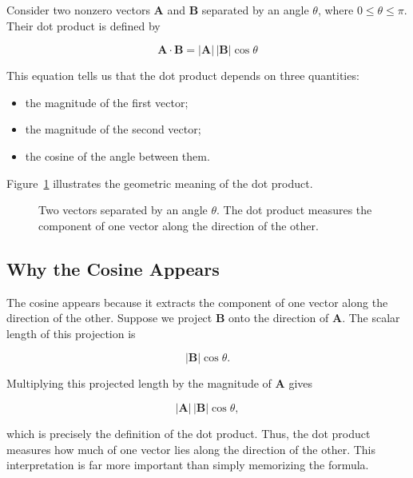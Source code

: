 Consider two nonzero vectors $\mathbf A$ and $\mathbf B$ separated by an angle
$\theta$, where $0\leq\theta\leq\pi$. Their dot product is defined by

\[
\boxed{
\mathbf A\cdot\mathbf B
=
\lvert\mathbf A\rvert\,\lvert\mathbf B\rvert\cos\theta
}
\]

This equation tells us that the dot product depends on three quantities:

\begin{itemize}
  \item the magnitude of the first vector;
  \item the magnitude of the second vector;
  \item the cosine of the angle between them.
\end{itemize}

Figure~\ref{fig:dot-product-angle} illustrates the geometric meaning of the dot
product.

\begin{figure}[htbp]
  \centering
  \begingroup
  
  \endgroup
  \caption{Two vectors separated by an angle $\theta$. The dot product measures
  the component of one vector along the direction of the other.}
  \label{fig:dot-product-angle}
\end{figure}

\subsection{Why the Cosine Appears}

The cosine appears because it extracts the component of one vector along the
direction of the other. Suppose we project $\mathbf B$ onto the direction of
$\mathbf A$. The scalar length of this projection is

\[
\lvert\mathbf B\rvert\cos\theta.
\]

Multiplying this projected length by the magnitude of $\mathbf A$ gives

\[
\lvert\mathbf A\rvert\,\lvert\mathbf B\rvert\cos\theta,
\]

which is precisely the definition of the dot product. Thus, the dot product
measures how much of one vector lies along the direction of the other. This
interpretation is far more important than simply memorizing the formula.

